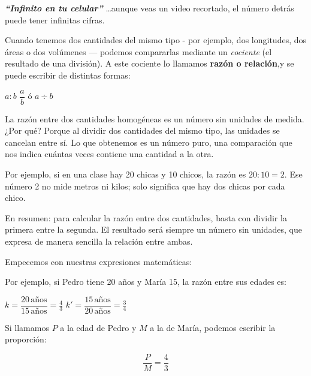 \begin{capitulobox}
\textbf{\textit{``Infinito en tu celular''}} \ldots aunque veas un video recortado, 
el número detrás puede tener infinitas cifras.
\end{capitulobox}


Cuando tenemos dos cantidades del mismo tipo - por ejemplo, dos longitudes, 
dos áreas o dos volúmenes — podemos compararlas mediante un \textit{cociente}
(el resultado de una división).
A este cociente lo llamamos \textbf{razón o relación},y se puede escribir de distintas formas:

\begin{center}
$a : b$ \qquad $\dfrac{a}{b}$ \qquad ó \qquad $a \div b$
\end{center}

La razón entre dos cantidades homogéneas es un número sin unidades de medida.
¿Por qué? Porque al dividir dos cantidades del mismo tipo, las unidades se cancelan entre sí.
Lo que obtenemos es un número puro, una comparación que nos indica cuántas
veces contiene una cantidad a la otra.

Por ejemplo, si en una clase hay 20 chicas y 10 chicos, la razón es $20:10 = 2$.
Ese número 2 no mide metros ni kilos; solo significa que hay dos chicas por cada chico.

En resumen: para calcular la razón entre dos cantidades, basta con dividir la primera entre la segunda.
El resultado será siempre un número sin unidades, que expresa de manera sencilla la relación entre ambas.

Empecemos con nuestras expresiones matemáticas:

Por ejemplo, si Pedro tiene 20 años y María 15, la razón entre sus edades
es:

\noindent {}

\begin{ejemplos}[2][\textbullet]
  \task $k  = \dfrac{20\,\text{años}}{15\,\text{años}} = \tfrac{4}{3}$
  \task $k' = \dfrac{15\,\text{años}}{20\,\text{años}} = \tfrac{3}{4}$
\end{ejemplos}

Si llamamos $P$ a la edad de Pedro y $M$ a la de María, podemos escribir la
proporción:

\[
\dfrac{P}{M} = \dfrac{4}{3} 
\]



